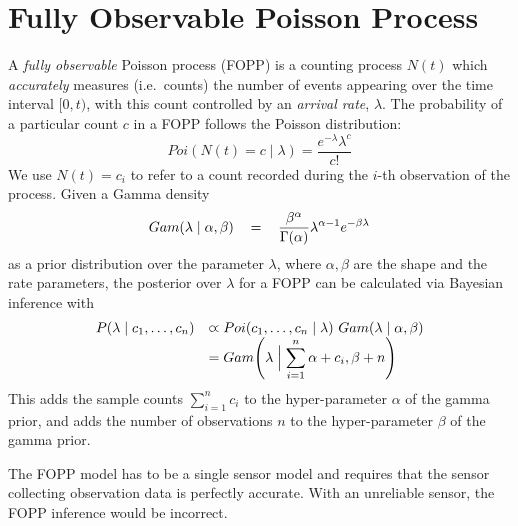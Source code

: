 
\section{Fully Observable Poisson Process}
\label{sec:preliminaries}

A \emph{fully observable} Poisson process (FOPP) is a counting process $N(t)$ which \emph{accurately} measures (i.e.~counts) the number of events appearing over the time interval $[0, t)$, with this count controlled by an \textit{arrival rate}, $\lambda$. The probability of a particular count $c$ in a FOPP follows the Poisson distribution:
\begin{equation}
    \label{eq:pmf_poisson}
	Poi(N(t) = c \mid \lambda) = \frac{e ^{-\lambda} \lambda ^{c}}{c!}
\end{equation}
We use $N(t) = c_i$ to refer to a count recorded during the $i$-th observation of the process.
Given a Gamma density
\begin{equation}
    \label{eq:pdf_gamma}
    \begin{tabular}{rcl}
        $Gam(\lambda \mid \alpha, \beta)$ & = & $\displaystyle\frac{\beta ^{\alpha}}{\Gamma (\alpha)} \lambda ^{\alpha - 1} e^{-\beta \lambda}$ \\ [1ex]
    \end{tabular}
\end{equation}
as a prior distribution over the parameter $\lambda$, where $\alpha, \beta$ are the shape and the rate parameters, the posterior over $\lambda$ for a FOPP can be  calculated via Bayesian inference with
\begin{equation}
    \label{eq:posterior_fopp}
    \begin{array}{lll}
        P(\lambda \mid c_1, \ldots, c_n) & \varpropto Poi(c_1, \ldots, c_n \mid \lambda) ~ Gam(\lambda \mid \alpha, \beta) \\
         & = Gam \Bigg(\lambda \Bigm| \displaystyle\sum_{i=1}^{n} \alpha + c_i, \beta + n \Bigg)
    \end{array}
\end{equation}
This adds the sample counts $\sum_{i=1}^{n} c_i$ to the hyper-parameter $\alpha$ of the gamma prior, and adds the number of observations $n$ to the hyper-parameter $\beta$ of the gamma prior.

The FOPP model has to be a single sensor model and requires that the sensor collecting observation data is perfectly accurate. With an unreliable sensor, the FOPP inference would be incorrect.